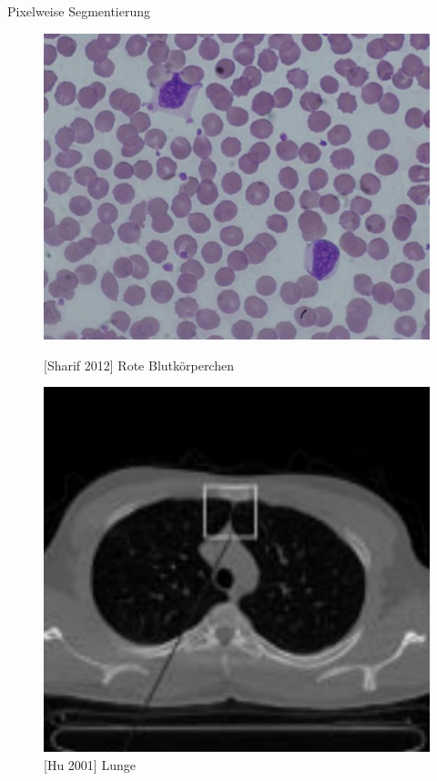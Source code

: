 \begin{frame}{Pixelweise Segmentierung}
    \begin{figure}[ht]
        \begin{minipage}[b]{0.45\linewidth}
            \centering
            \includegraphics[width=\textwidth]{../images/red-blood.png}
            \caption{[Sharif 2012] Rote Blutkörperchen}
            \label{fig:red-blood}
        \end{minipage}
        \hspace{0.5cm}
        \begin{minipage}[b]{0.45\linewidth}
            \centering
            \includegraphics[width=\textwidth]{../images/lung.png}
            \caption{[Hu 2001] Lunge}
            \label{fig:lung}
        \end{minipage}
    \end{figure}
\end{frame}

